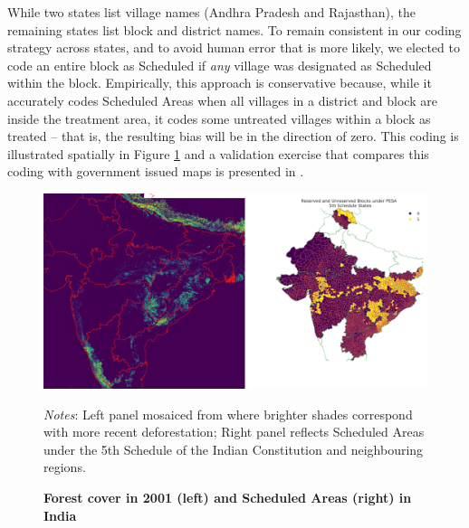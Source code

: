 \documentclass[12pt,reqno]{article}
\begin{document}
While two states list village names (Andhra Pradesh and Rajasthan), the remaining states list block and district names. To remain consistent in our coding strategy across states, and to avoid human error that is more likely, we elected to code an entire block as Scheduled if \emph{any} village was designated as Scheduled within the block. Empirically, this approach is conservative because, while it accurately codes Scheduled Areas when all villages in a district and block are inside the treatment area, it codes some untreated villages within a block as treated -- that is, the resulting bias will be in the direction of zero. This coding is illustrated spatially in Figure \ref{fig:schmap} and a validation exercise that compares this coding with government issued maps is presented in \textcite{gulzar2019}.




\begin{figure}[htbp!]
\begin{center}
\begin{minipage}{1 \linewidth}
\caption{\textbf{Forest cover in 2001 (left) and Scheduled Areas (right) in India}\label{fig:schmap}}	
\centerline{\includegraphics[width=6 in,angle=0]{Output/side_by_side.png}}
\smallskip
\scriptsize
\emph{Notes}: Left panel mosaiced from \textcite{Hansen2013-vk} where brighter shades correspond with more recent deforestation; Right panel reflects Scheduled Areas under the 5th Schedule of the Indian Constitution and neighbouring regions.
\end{minipage}
\end{center}
\end{figure}
\end{document}
